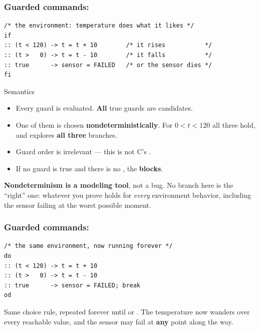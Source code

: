 \begin{frame}[fragile]
  \frametitle{Guarded commands: } \small

\begin{lstlisting}[language=promela]
/* the environment: temperature does what it likes */
if
:: (t < 120) -> t = t + 10        /* it rises           */
:: (t >   0) -> t = t - 10        /* it falls           */
:: true      -> sensor = FAILED   /* or the sensor dies */
fi
\end{lstlisting}

\pause
\vspace{0.2cm}

\begin{block}{Semantics}\small
\begin{itemize}
\item Every guard is evaluated. {\bf All} true guards are candidates.
\item One of them is chosen {\bf nondeterministically}. For $0 < t < 120$ all
      three hold, and \spin{} explores {\bf all three} branches.
\item Guard order is irrelevant --- this is not C's .
\item If no guard is true and there is no , the  {\bf blocks}.
\end{itemize}
\end{block}

\pause
\vspace{0.2cm}

{\bf Nondeterminism is a modeling tool}, not a bug. No branch here is the
``right'' one: whatever you prove holds for {\em every} environment behavior,
including the sensor failing at the worst possible moment.

\end{frame}

\begin{frame}[fragile]
  \frametitle{Guarded commands: } \small

\begin{lstlisting}[language=promela]
/* the same environment, now running forever */
do
:: (t < 120) -> t = t + 10
:: (t >   0) -> t = t - 10
:: true      -> sensor = FAILED; break
od
\end{lstlisting}

\vspace{0.2cm}

Same choice rule, repeated forever until  or .
The temperature now wanders over every reachable value, and the sensor may fail
at {\bf any} point along the way.

\end{frame}

